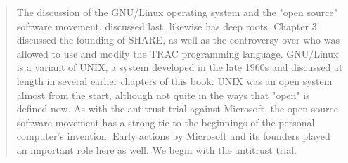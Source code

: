 \begin{quotation}
	The discussion of the GNU/Linux
	operating system and the "open source" software movement, discussed last,
	likewise has deep roots. Chapter 3 discussed the founding of SHARE, as well as
	the controversy over who was allowed to use and modify the TRAC programming
	language. GNU/Linux is a variant of UNIX, a system developed in the late 1960s
	and discussed at length in several earlier chapters of this book. UNIX was an
	open system almost from the start, although not quite in the ways that "open" is
	defined now. As with the antitrust trial against Microsoft, the open source
	software movement has a strong tie to the beginnings of the personal computer's
	invention. Early actions by Microsoft and its founders played an important role
	here as well. We begin with the
	antitrust trial.\cite{history_of_modern_computing_2003_ceruzzi}
\end{quotation}
